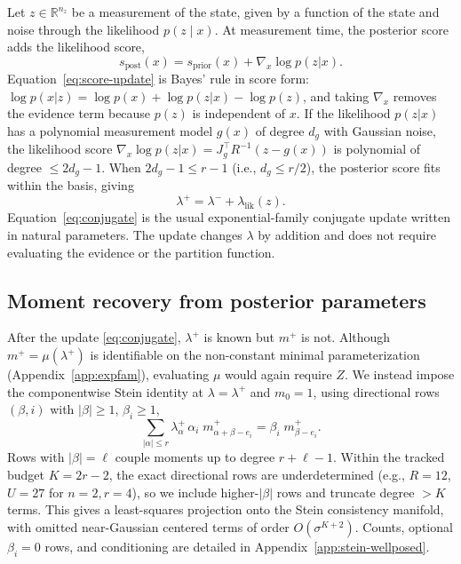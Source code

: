 \documentclass{article}
\newcommand{\R}{\mathbb{R}}
\theoremstyle{definition}
\begin{document}
Let $z \in \R^{n_z}$ be a measurement of the state, given by a function of the state and noise through the likelihood $p(z \mid x)$.
At measurement time, the posterior score adds the likelihood score,
\begin{equation}\label{eq:score-update}
    s_{\mathrm{post}}(x) = s_{\mathrm{prior}}(x) + \nabla_x \log p(z|x).
\end{equation}
Equation~\eqref{eq:score-update} is Bayes' rule in score form:
$\log p(x|z)=\log p(x)+\log p(z|x)-\log p(z)$, and taking
$\nabla_x$ removes the evidence term because $p(z)$ is independent of $x$.
If the likelihood $p(z|x)$ has a polynomial measurement model $g(x)$
of degree $d_g$ with Gaussian noise, the likelihood score
$\nabla_x \log p(z|x) = J_g^\top R^{-1}(z - g(x))$
is polynomial of degree $\le 2d_g - 1$.
When $2d_g - 1 \le r - 1$ (i.e., $d_g \le r/2$), the posterior
score fits within the basis, giving
\begin{equation}\label{eq:conjugate}
    \lambda^+ = \lambda^- + \lambda_{\mathrm{lik}}(z).
\end{equation}
Equation~\eqref{eq:conjugate} is the usual exponential-family
conjugate update written in natural parameters. The update changes
$\lambda$ by addition and does not require evaluating the evidence or
the partition function.

\subsection{Moment recovery from posterior parameters}
\label{sec:recovery}

After the update \eqref{eq:conjugate}, $\lambda^+$ is known but $m^+$ is not.
Although $m^+=\mu(\lambda^+)$ is identifiable on the non-constant minimal
parameterization (Appendix~\ref{app:expfam}), evaluating $\mu$ would again
require $Z$. We instead impose the componentwise Stein identity at
$\lambda=\lambda^+$ and $m_0=1$, using directional rows $(\beta,i)$ with
$|\beta|\ge 1$, $\beta_i\ge 1$,
\begin{equation}\label{eq:stein-recovery}
    \sum_{|\alpha| \le r} \lambda^+_\alpha\, \alpha_i\;
    m^+_{\alpha+\beta-e_i}
    = \beta_i\; m^+_{\beta-e_i}.
\end{equation}
Rows with $|\beta|=\ell$ couple moments up to degree $r+\ell-1$.
Within the tracked budget $K=2r-2$, the exact directional rows are
underdetermined (e.g., $R=12$, $U=27$ for $n=2,r=4$), so we include
higher-$|\beta|$ rows and truncate degree $>K$ terms. This gives a
least-squares projection onto the Stein consistency manifold, with omitted
near-Gaussian centered terms of order $O(\sigma^{K+2})$. Counts, optional
$\beta_i=0$ rows, and conditioning are detailed in Appendix~\ref{app:stein-wellposed}.
\end{document}
